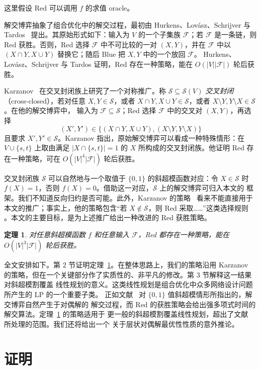 \documentclass[UTF8,11pt,a4paper]{ctexart}
\newtheorem{theorem}{定理}
\numberwithin{equation}{section}
\newcommand{\calS}{\mathcal S}
\newcommand{\calF}{\mathcal F}
\begin{document}
这里假设 Red 可以调用 $f$ 的求值 oracle。

解交博弈抽象了组合优化中的解交过程，最初由 Hurkens、Lov\'asz、Schrijver 与
Tardos~\cite{HLST} 提出。其原始形式如下：输入为 $V$ 的一个子集族 $\calF$；若
$\calF$ 是一条链，则 Red 获胜。否则，Red 选择 $\calF$ 中不可比较的一对 $(X,Y)$，并在
$\calF$ 中以 $(X\cap Y,X\cup Y)$ 替换它；随后 Blue 把 $X,Y$ 中的一个放回 $\calF$。
Hurkens、Lov\'asz、Schrijver 与 Tardos 证明，Red 存在一种策略，能在
$O(|V||\calF|)$ 轮后获胜。

Karzanov~\cite{Karzanov} 在交叉封闭族上研究了一个对称推广。称
$\calS\subseteq\calS(V)$ \emph{交叉封闭}（cross-closed），若对任意 $X,Y\in\calS$，或者
$X\cap Y,X\cup Y\in\calS$，或者 $X\setminus Y,Y\setminus X\in\calS$。在他的解交博弈中，
输入为 $\calF\subseteq\calS$；Red 选择 $\calF$ 中的交叉对 $(X,Y)$，再选择
\[
(X',Y')\in\bigl\{(X\cap Y,X\cup Y),
(X\setminus Y,Y\setminus X)\bigr\}
\]
且要求 $X',Y'\in\calS$。Karzanov 指出，原始解交博弈可以看成一种特殊情形：在
$V\cup\{s,t\}$ 上取由满足 $|X\cap\{s,t\}|=1$ 的 $X$ 所构成的交叉封闭族。他证明 Red
存在一种策略，可在 $O(|V|^4|\calF|)$ 轮后获胜。

交叉封闭族 $\calS$ 可以自然地与一个取值于 $\{0,1\}$ 的斜超模函数对应：令
$X\in\calS$ 时 $f(X)=1$，否则 $f(X)=0$。借助这一对应，$\calS$ 上的解交博弈可归入本文的
框架。我们不知道反向归约是否可能。此外，Karzanov 的策略~\cite{Karzanov} 看来不能直接用于
本文的推广；事实上，他的策略包含“若 $X\notin\calS$，则 Red 采取……”这类选择规则
\cite[p.~222]{Karzanov}。本文的主要目标，是为上述推广给出一种改进的 Red 获胜策略。

\begin{theorem}\label{thm:main}
对任意斜超模函数 $f$ 和任意输入 $\calF$，Red 都存在一种策略，能在
$O(|V|^3|\calF|)$ 轮后获胜。
\end{theorem}

全文安排如下。第 2 节证明定理~\ref{thm:main}。在整体思路上，我们的策略沿用 Karzanov
的策略，但在一个关键部分作了实质性的、非平凡的修改。第 3 节解释这一结果对斜超模割覆盖
线性规划的意义。这类线性规划是组合优化中众多网络设计问题所产生的 LP 的一个重要子类。
正如文献~\cite{Karzanov} 对 $\{0,1\}$ 值斜超模情形所指出的，解交博弈自然产生于对偶解的
解交过程，而 Red 的获胜策略会给出强多项式时间的解交算法。定理~\ref{thm:main} 的策略适用于
更一般的斜超模割覆盖线性规划，超出了文献~\cite{Karzanov} 所处理的范围。我们还将给出一个
关于层状对偶解最优性性质的意外推论。

\section{证明}
\end{document}

